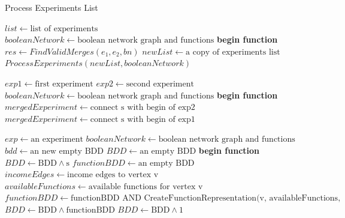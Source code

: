 \documentclass{article}      %
\newcounter{ct}
\begin{document}
\pagebreak

\begin{algorithm} \caption{Process Experiments List}
\begin{algorithmic}[1]
\State $list \gets \text{list of experiments}$
\State $booleanNetwork \gets \text{boolean network graph and functions}$
\State \textbf{begin function}
        \State $res \gets FindValidMerges(e_1, e_2, bn)$
                \State $newList \gets \text{a copy of experiments list}$
        \State {}
        \State {} $ProcessExperiments(newList, booleanNetwork)$
        \EndIf
        
        
    \EndFor
        \EndIf
\EndFunction

\end{algorithmic}
\end{algorithm}
\begin{algorithm}
\begin{algorithmic}[1]
\State $exp1 \gets \text{first experiment}$
\State $exp2 \gets \text{second experiment}$
\State $booleanNetwork \gets \text{boolean network graph and functions}$
\State \textbf{begin function}
        \State $mergedExperiment \gets \text{connect s with begin of exp2}$
                \State {}
        \EndIf
    \EndFor
        \State $mergedExperiment \gets \text{connect s with begin of exp1}$
                \State {}
        \EndIf
    \EndFor
\EndFunction
\end{algorithmic}
\end{algorithm}
\begin{algorithm}
\begin{algorithmic}[1]
\State $exp \gets \text{an experiment}$
\State $booleanNetwork \gets \text{boolean network graph and functions}$
\State $bdd \gets \text{an new empty BDD}$
\State {}
\State $BDD \gets \text{an empty BDD}$
\State \textbf{begin function}
        \State $BDD \gets \text {BDD} \wedge \text {s}$
    \EndFor
\State $functionBDD \gets \text{an empty BDD}$
        \State $incomeEdges \gets \text{income edges to vertex v}$
        \State $availableFunctions \gets \text{available functions for vertex v}$
        \State $functionBDD \gets \text{functionBDD AND CreateFunctionRepresentation(v, availableFunctions, incomeEdges, experiment.length)}$
    \EndFor
\State $BDD \gets \text{BDD} \wedge \text {functionBDD}$
\State $BDD \gets \text{BDD} \wedge \text{1}$
    \State {}
\EndIf
    \State {}
\EndFunction
\end{algorithmic}
\end{algorithm}
\end{document}
